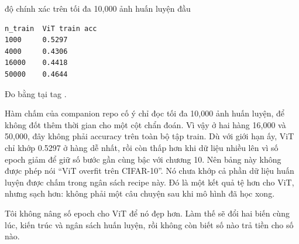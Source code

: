 \begin{measured}{độ chính xác trên tối đa 10,000 ảnh huấn luyện đầu}
\begin{verbatim}
n_train  ViT train acc
1000     0.5297
4000     0.4306
16000    0.4418
50000    0.4644
\end{verbatim}

Đo bằng  tại tag .
\end{measured}

Hàm chấm của companion repo cố ý chỉ đọc tối đa 10,000 ảnh huấn luyện, để không
đốt thêm thời gian cho một cột chẩn đoán. Vì vậy ở hai hàng 16,000 và 50,000,
đây không phải accuracy trên toàn bộ tập train. Dù với giới hạn ấy, ViT chỉ
khớp 0.5297 ở hàng dễ nhất, rồi còn thấp hơn khi dữ liệu nhiều lên vì số epoch
giảm để giữ số bước gần cùng bậc với chương 10. Nên bảng này không được phép
nói \enquote{ViT overfit trên CIFAR-10}. Nó chưa khớp cả phần dữ liệu huấn luyện
được chấm trong ngân sách recipe này. Đó là một kết quả tệ hơn cho ViT, nhưng
sạch hơn: không phải một câu chuyện sau khi mô hình đã học xong.

Tôi không nâng số epoch cho ViT để nó đẹp hơn. Làm thế sẽ đổi hai biến cùng
lúc, kiến trúc và ngân sách huấn luyện, rồi không còn biết số nào trả tiền cho
số nào.
